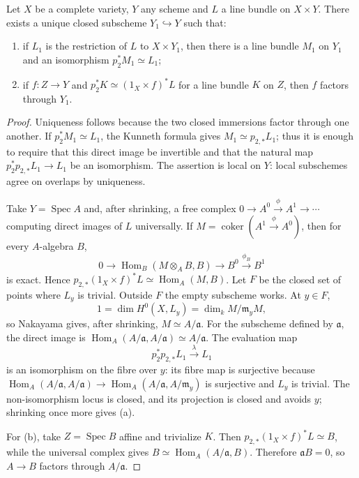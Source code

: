\begin{proposition}
\label{mumford-prop-maximal-triviality-scheme}
Let $X$ be a complete variety, $Y$ any scheme and $L$ a line bundle on
$X\times Y$. There exists a unique closed subscheme $Y_1\hookrightarrow Y$
such that:
\begin{enumerate}
\item if $L_1$ is the restriction of $L$ to $X\times Y_1$, then
there is a line bundle $M_1$ on $Y_1$ and an isomorphism
$p_2^*M_1\simeq L_1$;
\item if $f:Z\to Y$ and $p_2^*K\simeq(1_X\times f)^*L$ for a line bundle
$K$ on $Z$, then $f$ factors through $Y_1$.
\end{enumerate}
\end{proposition}
\begin{proof}
Uniqueness follows because the two closed immersions factor through one
another. If $p_2^*M_1\simeq L_1$, the Kunneth formula gives
$M_1\simeq p_{2,*}L_1$; thus it is enough to require that this direct image
be invertible and that the natural map $p_2^*p_{2,*}L_1\to L_1$ be an
isomorphism. The assertion is local on $Y$: local subschemes agree on
overlaps by uniqueness.

Take $Y=\operatorname{Spec}A$ and, after shrinking, a free complex
$0\to A^0\xrightarrow{\phi}A^1\to\cdots$ computing direct images of $L$
universally. If $M=\operatorname{coker}(A^1\xrightarrow{\phi}A^0)$, then for
every $A$-algebra $B$,
\[
0\to\operatorname{Hom}_B(M\otimes_A B,B)\to B^0\xrightarrow{\phi_B}B^1
\]
is exact. Hence
$p_{2,*}(1_X\times f)^*L\simeq\operatorname{Hom}_A(M,B)$.
Let $F$ be the closed set of points where $L_y$ is trivial. Outside $F$ the
empty subscheme works. At $y\in F$,
\[
1=\dim H^0(X,L_y)=\dim_k M/\mathfrak m_yM,
\]
so Nakayama gives, after shrinking, $M\simeq A/\mathfrak a$. For the
subscheme defined by $\mathfrak a$, the direct image is
$\operatorname{Hom}_A(A/\mathfrak a,A/\mathfrak a)\simeq A/\mathfrak a$.
The evaluation map
\[
p_2^*p_{2,*}L_1\xrightarrow{\lambda}L_1
\]
is an isomorphism on the fibre over $y$: its fibre map is surjective because
\(\operatorname{Hom}_A(A/\mathfrak a,A/\mathfrak a)\to
\operatorname{Hom}_A(A/\mathfrak a,A/\mathfrak m_y)\) is surjective and
$L_y$ is trivial. The non-isomorphism locus is closed, and its projection is
closed and avoids $y$; shrinking once more gives (a).

For (b), take $Z=\operatorname{Spec}B$ affine and trivialize $K$. Then
$p_{2,*}(1_X\times f)^*L\simeq B$, while the universal complex gives
$B\simeq\operatorname{Hom}_A(A/\mathfrak a,B)$. Therefore
$\mathfrak aB=0$, so $A\to B$ factors through $A/\mathfrak a$.
\end{proof}

